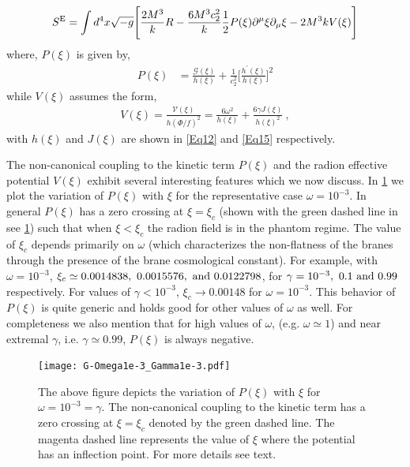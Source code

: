\documentclass{article}
\begin{document}
\begin{align}
S^{\rm E}=\int d^4 x \sqrt{-{g}}\Bigg[\frac{2M^3}{k}R
-\frac{6M^3c_2^2}{k}\frac{1}{2}P(\xi)\partial^\mu\xi\partial_\mu\xi
-2M^3k V(\xi)\Bigg]  
\label{Eq17} 
\end{align}
where, ${P}(\xi)$ is given by,
\begin{align}
P(\xi)&=\frac{\mathcal{G}(\xi)}{h(\xi)}+\frac{1}{c_2^2}\bigg[\frac{h^\prime(\xi)}{h(\xi)}\bigg]^2  
\label{Eq18}   
\end{align}
while $V(\xi)$ assumes the form,
\begin{align}
V(\xi)=\frac{\mathcal{V}(\xi)}{h(\Phi/f)^2}=\frac{6\omega^2}{h(\xi)} + \frac{6\gamma J(\xi)}{h(\xi)^2}~,
\label{Eq19} 
\end{align}
with $h(\xi)$ and $J(\xi)$ are shown in \ref{Eq12} and \ref{Eq15} respectively. 


The non-canonical coupling to the kinetic term $P(\xi)$ and the radion effective potential $V(\xi)$ exhibit several interesting features which we now discuss.
In \ref{Fig_01} we plot the variation of $P(\xi)$ with $\xi$ for the representative case $\omega=10^{-3}$. In general $P(\xi)$ has a zero crossing at $\xi=\xi_c $ (shown with the green dashed line in see \ref{Fig_01}) such that when $\xi<\xi_c$ the radion field is in the phantom regime. The value of $\xi_c$ depends primarily on $\omega$ (which characterizes the non-flatness of the branes through the presence of the brane cosmological constant). For example, with $\omega=10^{-3}$,  
$\xi_c\simeq 0.0014838, ~0.0015576, {~\rm and}~ 0.0122798$,  for $\gamma=10^{-3},~0.1~ {\rm and}~0.99$ respectively. For values of $\gamma<10^{-3}$, $\xi_c\to 0.00148$ for $\omega=10^{-3}$. This behavior of $P(\xi)$ is quite generic and holds good for other values of $\omega$ as well. 
For completeness we also mention that for high values of $\omega$, (e.g. $\omega\simeq 1$) and near extremal $\gamma$, i.e. $\gamma\simeq 0.99$, $P(\xi)$ is always negative.


\begin{figure}[t]
\centering
\texttt{[image: G-Omega1e-3\_Gamma1e-3.pdf]}~~
\caption{The above figure depicts the variation of $P(\xi)$ with $\xi$ for $\omega=10^{-3}=\gamma$. The non-canonical coupling to the kinetic term has a zero crossing at $\xi=\xi_c$ denoted by the green dashed line. The magenta dashed line represents the value of $\xi$ where the potential has an inflection point.
For more details see text. }
\label{Fig_01}
\end{figure}
\end{document}
